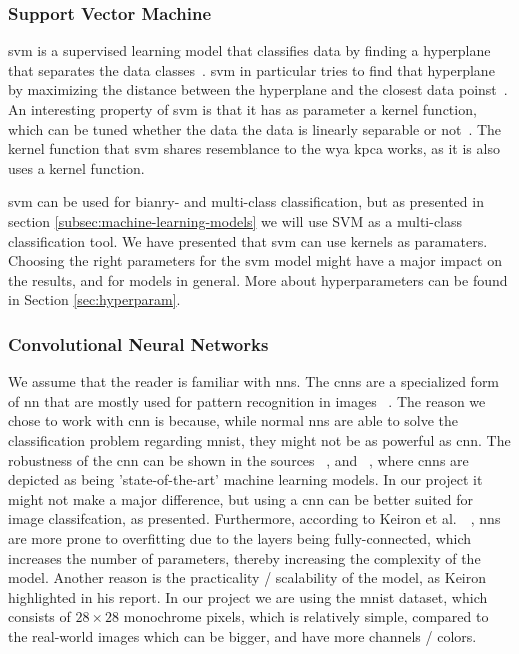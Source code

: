 \subsubsection{Support Vector Machine}\label{subsubsec:support-vector-machine}
\gls{svm} is a supervised learning model that classifies data by finding a hyperplane that separates the data classes~\cite{faster-svm}. \gls{svm} in particular tries to find that hyperplane by maximizing the distance between the hyperplane and the closest data poinst~\cite{faster-svm}. An interesting property of \gls{svm} is that it has as parameter a kernel function, which can be tuned whether the data the data is linearly separable or not~\cite{faster-svm}. The kernel function that \gls{svm} shares resemblance to the wya \gls{kpca} works, as it is also uses a kernel function.


\gls{svm} can be used for bianry- and multi-class classification, but as presented in section \ref{subsec:machine-learning-models} we will use SVM as a multi-class classification tool. We have presented that \gls{svm} can use kernels as paramaters. Choosing the right parameters for the \gls{svm} model might have a major impact on the results, and for models in general. More about hyperparameters can be found in Section \ref{sec:hyperparam}.


\subsubsection{Convolutional Neural Networks}\label{subsubsec:convolutional-neural-networks}
We assume that the reader is familiar with \gls{nn}s. The \gls{cnn}s are a specialized form of \gls{nn} that are mostly used for pattern recognition in images ~\cite{introduction-to-cnn}. The reason we chose to work with \gls{cnn} is because, while normal \gls{nn}s are able to solve the classification problem regarding \gls{mnist}, they might not be as powerful as \gls{cnn}. The robustness of the \gls{cnn} can be shown in the sources ~\cite{lecun-mnist-database}, and  ~\cite{mnist-classification-benchmark}, where \gls{cnn}s are depicted as being 'state-of-the-art' machine learning models. In our project it might not make a major difference, but using a \gls{cnn} can be better suited for image classifcation, as presented. Furthermore, according to Keiron et al.\ ~\cite{introduction-to-cnn}, \gls{nn}s are more prone to overfitting due to the layers being fully-connected, which increases the number of parameters, thereby increasing the complexity of the model. Another reason is the practicality / scalability of the model, as Keiron highlighted in his report. In our project we are using the \gls{mnist} dataset, which consists of $28 \times 28$ monochrome pixels, which is relatively simple, compared to the real-world images which can be bigger, and have more channels / colors.


